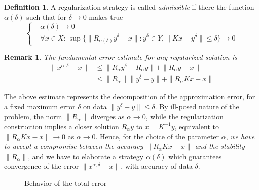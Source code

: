 \documentclass[10pt, a4paper, twoside, openright]{book}
\theoremstyle{definition}
\newtheorem{definition}[subsection]{Definition}
\theoremstyle{plain}
\theoremstyle{plain}
\theoremstyle{plain}
\theoremstyle{plain}
\newtheorem{remark}[subsection]{Remark}
\theoremstyle{plain}
\theoremstyle{plain}
\theoremstyle{plain}
\theoremstyle{plain}
\begin{document}
\begin{definition}
 A regularization strategy is called \emph{admissible} if there the function $\alpha(\delta)$ such that for $\delta \to 0$ makes true
 \begin{equation}
 \left\{
 \begin{aligned}
  &\alpha(\delta) \to 0 \\
  &\forall x \in X: \,\sup\bigl\{\bigl\|R_{\alpha(\delta)} y^\delta - x\bigr\|:y^\delta \in Y, \|Kx - y^\delta\|\leq\delta\bigr\} \to 0
 \end{aligned}
 \right.
 \end{equation}
\end{definition}
\begin{remark}
The fundamental error estimate for any regularized solution is
\begin{align}
\label{eq:fundamental-error-estimate}
 \|x^{\alpha, \delta} - x\| &\leq \|R_\alpha y^\delta - R_\alpha y\| + \|R_\alpha y - x\| \\
                            &\leq \|R_\alpha\| \|y^\delta - y\| + \|R_\alpha Kx - x\|
\end{align}
\end{remark}
The above estimate represents the decomposition of the approximation error, for a fixed maximum error $\delta$ on data $\|y^\delta - y\|\leq \delta$. By ill-posed nature of the problem, the norm $\|R_\alpha\|$ diverges as $\alpha\to 0$, while the regularization construction implies a closer solution $R_\alpha y$ to $x=K^{-1}y$, equivalent to $\|R_\alpha Kx -x\|\to 0$ as $\alpha\to0$.
Hence, for the choice of the parameter $\alpha$, \emph{we have to accept a compromise between the accuracy $\|R_\alpha Kx -x\|$ and the stability $\|R_\alpha\|$}, and we have to elaborate a strategy $\alpha(\delta)$ which guarantees convergence of the error $\|x^{\alpha,\delta} - x\|$, with accuracy of data $\delta$.
\par
\begin{figure}[h]
\begin{center}
\end{center}
\caption{Behavior of the total error}
\end{figure}
\end{document}
